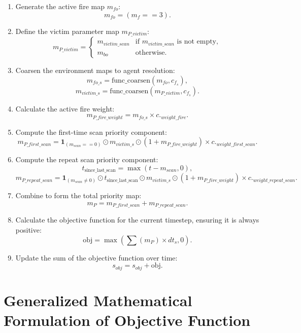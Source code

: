 \documentclass{article}
\begin{document}
\begin{enumerate}
    \item Generate the active fire map $m_{fo}$:
    \[ m_{fo} = (m_f == 3). \]

    \item Define the victim parameter map $m_{P\_victim}$:
    \[ m_{P\_victim} = 
    \begin{cases} 
        m_{victim\_scan} & \text{if } m_{victim\_scan} \text{ is not empty}, \\
        m_{bo} & \text{otherwise}.
    \end{cases} \]

    \item Coarsen the environment maps to agent resolution:
    \[ m_{fo\_s} = \text{func\_coarsen}(m_{fo}, c_{f_s}), \]
    \[ m_{victim\_s} = \text{func\_coarsen}(m_{P\_victim}, c_{f_s}). \]

    \item Calculate the active fire weight:
    \[ m_{P\_fire\_weight} = m_{fo\_s} \times c._{weight\_fire}. \]

    \item Compute the first-time scan priority component:
    \[ m_{P\_first\_scan} = \mathbf{1}_{(m_{scan} == 0)} \odot m_{victim\_s} \odot (1 + m_{P\_fire\_weight}) \times c._{weight\_first\_scan}. \]

    \item Compute the repeat scan priority component:
    \[ t_{\text{since\_last\_scan}} = \max(t - m_{scan}, 0), \]
    \[ m_{P\_repeat\_scan} = \mathbf{1}_{(m_{scan} \neq 0)} \odot t_{\text{since\_last\_scan}} \odot m_{victim\_s} \odot (1 + m_{P\_fire\_weight}) \times c._{weight\_repeat\_scan}. \]

    \item Combine to form the total priority map:
    \[ m_{P} = m_{P\_first\_scan} + m_{P\_repeat\_scan}. \]

    \item Calculate the objective function for the current timestep, ensuring it is always positive:
    \[ \text{obj} = \max(\sum(m_{P}) \times dt_s, 0). \]

    \item Update the sum of the objective function over time:
    \[ s_{obj} = s_{obj} + \text{obj}. \]
\end{enumerate}

\section*{Generalized Mathematical Formulation of Objective Function}
\end{document}
